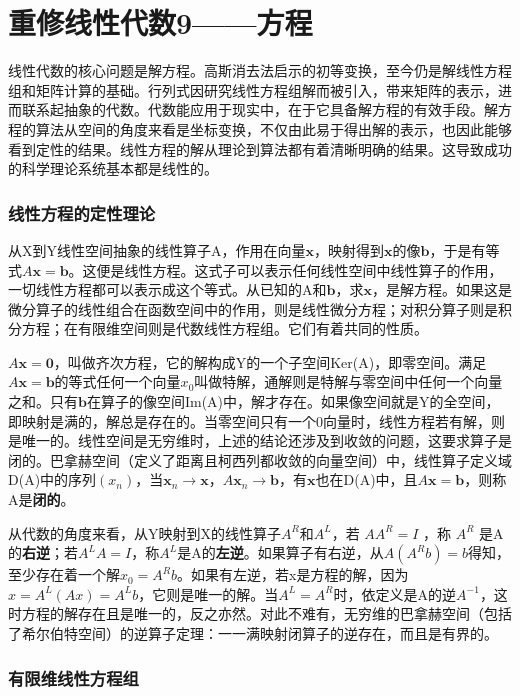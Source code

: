 \chapter{重修线性代数9——方程}

线性代数的核心问题是解方程。高斯消去法启示的初等变换，至今仍是解线性方程组和矩阵计算的基础。行列式因研究线性方程组解而被引入，带来矩阵的表示，进而联系起抽象的代数。代数能应用于现实中，在于它具备解方程的有效手段。解方程的算法从空间的角度来看是坐标变换，不仅由此易于得出解的表示，也因此能够看到定性的结果。线性方程的解从理论到算法都有着清晰明确的结果。这导致成功的科学理论系统基本都是线性的。

\subsection{线性方程的定性理论}

从X到Y线性空间抽象的线性算子A，作用在向量$ \bm{x} $，映射得到$ \bm{x} $的像$ \bm{b} $，于是有等式$ A\bm{x}=\bm{b} $。这便是线性方程。这式子可以表示任何线性空间中线性算子的作用，一切线性方程都可以表示成这个等式。从已知的A和$ \bm{b} $，求$ \bm{x} $，是解方程。如果这是微分算子的线性组合在函数空间中的作用，则是线性微分方程；对积分算子则是积分方程；在有限维空间则是代数线性方程组。它们有着共同的性质。

$ A\bm{x}=\bm{0} $，叫做齐次方程，它的解构成Y的一个子空间Ker(A)，即零空间。满足$ A\bm{x}=\bm{b} $的等式任何一个向量$ x_0 $叫做特解，通解则是特解与零空间中任何一个向量之和。只有$ \bm{b} $在算子的像空间Im(A)中，解才存在。如果像空间就是Y的全空间，即映射是满的，解总是存在的。当零空间只有一个0向量时，线性方程若有解，则是唯一的。线性空间是无穷维时，上述的结论还涉及到收敛的问题，这要求算子是闭的。巴拿赫空间（定义了距离且柯西列都收敛的向量空间）中，线性算子定义域D(A)中的序列$ (x_n) $，当$ \bm{x}_n\rightarrow \bm{x} ，A\bm{x}_n\rightarrow\bm{b}$，有$ \bm{x} $也在D(A)中，且$ A\bm{x}=\bm{b} $，则称A是\textbf{闭的}。

从代数的角度来看，从Y映射到X的线性算子$ A^R $和$ A^L $，若 $ AA^R= I $ ，称 $ A^R $ 是A的\textbf{右逆}；若$ A^LA=I $，称$ A^L $是A的\textbf{左逆}。如果算子有右逆，从$ A(A^R b)= b $得知，至少存在着一个解$ x_0=A^Rb $。如果有左逆，若x是方程的解，因为$ x=A^L(Ax)=A^Lb $，它则是唯一的解。当$ A^L=A^R $时，依定义是A的逆$ A^{-1} $，这时方程的解存在且是唯一的，反之亦然。对此不难有，无穷维的巴拿赫空间（包括了希尔伯特空间）的逆算子定理：一一满映射闭算子的逆存在，而且是有界的。

\subsection{有限维线性方程组}

